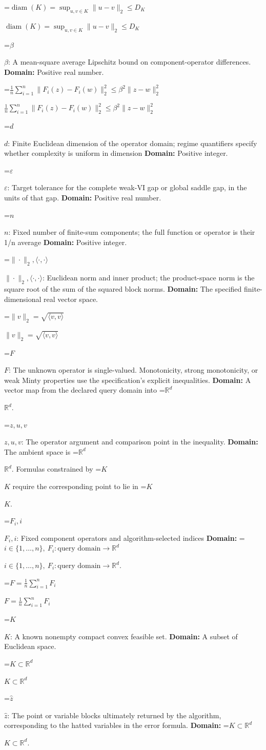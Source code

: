 \documentclass[10pt,a4paper]{article}
\newcommand{\AtlasMath}[1]{\par\begingroup\centering\setbox0=\hbox{$\displaystyle #1$}\ifdim\wd0>1.4\linewidth\typeout{ATLAS WIDE FORMULA: \the\wd0}\fi\ifdim\wd0>\linewidth\resizebox{\linewidth}{!}{\box0}\else\box0\fi\par\endgroup}
\newcommand{\AtlasInlineMath}[1]{\begingroup\setbox0=\hbox{$#1$}\ifdim\wd0>.4\linewidth\endgroup\AtlasMath{#1}\else\endgroup$#1$\fi}
\begin{document}
\AtlasInlineMath{\operatorname{diam}(K)=\sup_{u,v\in K}\|u-v\|_2\le D_K}

\AtlasInlineMath{\beta}: A mean-square average Lipschitz bound on component-operator differences. \textbf{Domain:} Positive real number.

\AtlasInlineMath{\frac1n\sum_{i=1}^n\|F_i(z)-F_i(w)\|_2^2\le\beta^2\|z-w\|_2^2}

\AtlasInlineMath{d}: Finite Euclidean dimension of the operator domain; regime quantifiers specify whether complexity is uniform in dimension \textbf{Domain:} Positive integer.

\AtlasInlineMath{\varepsilon}: Target tolerance for the complete weak-VI gap or global saddle gap, in the units of that gap. \textbf{Domain:} Positive real number.

\AtlasInlineMath{n}: Fixed number of finite-sum components; the full function or operator is their 1/n average \textbf{Domain:} Positive integer.

\AtlasInlineMath{\|\cdot\|_2,\langle\cdot,\cdot\rangle}: Euclidean norm and inner product; the product-space norm is the square root of the sum of the squared block norms. \textbf{Domain:} The specified finite-dimensional real vector space.

\AtlasInlineMath{\|v\|_2=\sqrt{\langle v,v\rangle}}

\AtlasInlineMath{F}: The unknown operator is single-valued. Monotonicity, strong monotonicity, or weak Minty properties use the specification’s explicit inequalities. \textbf{Domain:} A vector map from the declared query domain into \AtlasInlineMath{\mathbb R^d}.

\AtlasInlineMath{z,u,v}: The operator argument and comparison point in the inequality. \textbf{Domain:} The ambient space is \AtlasInlineMath{\mathbb R^d}. Formulas constrained by \AtlasInlineMath{K} require the corresponding point to lie in \AtlasInlineMath{K}.

\AtlasInlineMath{F_i,i}: Fixed component operators and algorithm-selected indices \textbf{Domain:} \AtlasInlineMath{i\in\{1,\ldots,n\},\ F_i:\text{query domain}\to\mathbb R^d}.

\AtlasInlineMath{F=\frac1n\sum_{i=1}^n F_i}

\AtlasInlineMath{K}: A known nonempty compact convex feasible set. \textbf{Domain:} A subset of Euclidean space.

\AtlasInlineMath{K\subset\mathbb R^d}

\AtlasInlineMath{\widehat z}: The point or variable blocks ultimately returned by the algorithm, corresponding to the hatted variables in the error formula. \textbf{Domain:} \AtlasInlineMath{K\subset\mathbb R^d}.
\end{document}

